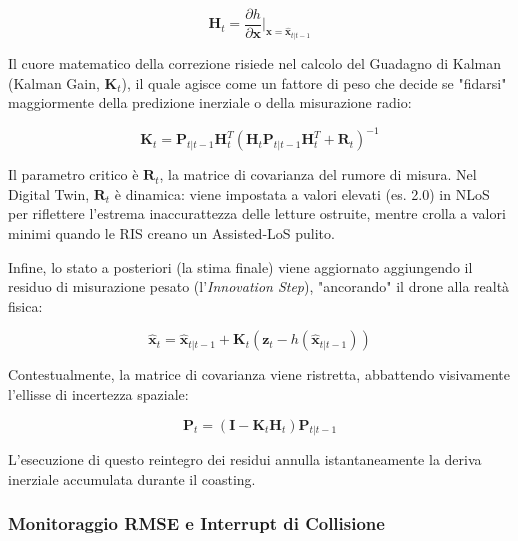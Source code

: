 \documentclass[twoside]{article}
\begin{document}
\begin{equation}
\mathbf{H}_t = \frac{\partial h}{\partial \mathbf{x}} \bigg|_{\mathbf{x}=\hat{\mathbf{x}}_{t|t-1}}
\label{eq:ekf_jacobian}
\end{equation}

Il cuore matematico della correzione risiede nel calcolo del Guadagno di Kalman (Kalman Gain, $\mathbf{K}_t$), il quale agisce come un fattore di peso che decide se "fidarsi" maggiormente della predizione inerziale o della misurazione radio:

\begin{equation}
\mathbf{K}_t = \mathbf{P}_{t|t-1} \mathbf{H}_t^T (\mathbf{H}_t \mathbf{P}_{t|t-1} \mathbf{H}_t^T + \mathbf{R}_t)^{-1}
\label{eq:ekf_kalman_gain}
\end{equation}

Il parametro critico è $\mathbf{R}_t$, la matrice di covarianza del rumore di misura. Nel Digital Twin, $\mathbf{R}_t$ è dinamica: viene impostata a valori elevati (es. 2.0) in NLoS per riflettere l'estrema inaccurattezza delle letture ostruite, mentre crolla a valori minimi quando le RIS creano un Assisted-LoS pulito.

Infine, lo stato a posteriori (la stima finale) viene aggiornato aggiungendo il residuo di misurazione pesato (l'\textit{Innovation Step}), "ancorando" il drone alla realtà fisica: 

\begin{equation}
\hat{\mathbf{x}}_t = \hat{\mathbf{x}}_{t|t-1} + \mathbf{K}_t (\mathbf{z}_t - h(\hat{\mathbf{x}}_{t|t-1}))
\label{eq:ekf_posterior_state}
\end{equation}

Contestualmente, la matrice di covarianza viene ristretta, abbattendo visivamente l'ellisse di incertezza spaziale:

\begin{equation}
\mathbf{P}_t = (\mathbf{I} - \mathbf{K}_t \mathbf{H}_t) \mathbf{P}_{t|t-1}
\label{eq:ekf_posterior_cov}
\end{equation}

L'esecuzione di questo reintegro dei residui annulla istantaneamente la deriva inerziale accumulata durante il coasting.

\subsubsection{Monitoraggio RMSE e Interrupt di Collisione}
\end{document}
